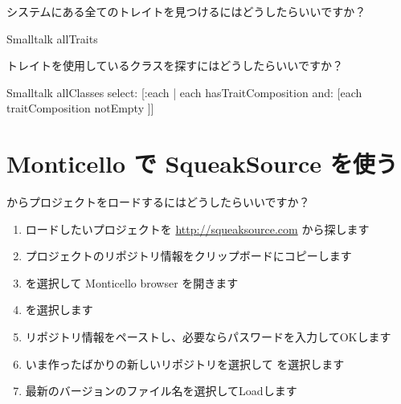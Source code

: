 \documentclass[a4paper,10pt,twoside]{book}
\begin{document}
\begin{faq}
システムにある全てのトレイトを見つけるにはどうしたらいいですか？
\end{faq}
\answer
\begin{code}{}
Smalltalk allTraits
\end{code}

\begin{faq}
トレイトを使用しているクラスを探すにはどうしたらいいですか？
\end{faq}
\answer
\begin{code}{}
Smalltalk allClasses select: [:each | each hasTraitComposition and: [each traitComposition notEmpty ]]
\end{code}

\section{Monticello で SqueakSource を使う}

\begin{faq}
 からプロジェクトをロードするにはどうしたらいいですか？
\end{faq}
\answer
\begin{enumerate}
  \item ロードしたいプロジェクトを \url{http://squeaksource.com} から探します
  \item プロジェクトのリポジトリ情報をクリップボードにコピーします
  \item {} を選択して Monticello browser を開きます
  \item {} を選択します
  \item リポジトリ情報をペーストし、必要ならパスワードを入力してOKします
  \item いま作ったばかりの新しいリポジトリを選択して  を選択します
  \item 最新のバージョンのファイル名を選択してLoadします
\end{enumerate}
\end{document}
